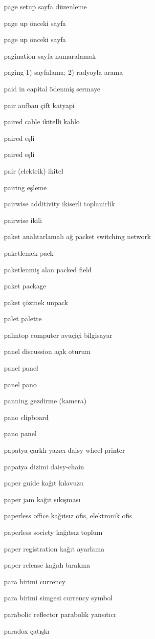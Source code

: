 \documentclass[12pt,fleqn]{article}\usepackage{../../common}
\begin{document}
page setup sayfa düzenleme

page up önceki sayfa

page up önceki sayfa

pagination sayfa numaralamak

paging 1) sayfalama; 2) radyoyla arama

paid in capital ödenmiş sermaye

pair aufbau çift katyapi

paired cable ikitelli kablo

paired eşli

paired eşli

pair (elektrik) ikitel

pairing eşleme

pairwise additivity ikiserli toplanirlik

pairwise ikili

paket anahtarlamalı ağ packet switching network

paketlemek pack

paketlenmiş alan packed field

paket package

paket çözmek unpack

palet palette

palmtop computer avuçiçi bilgisayar

panel discussion açık oturum

panel panel

panel pano

panning gezdirme (kamera)

pano clipboard

pano panel

papatya çarklı yazıcı daisy wheel printer

papatya dizimi daisy-chain

paper guide kağıt kılavuzu

paper jam kağıt sıkışması

paperless office kağıtsız ofis, elektronik ofis

paperless society kağıtsız toplum

paper registration kağıt ayarlama

paper release kağıdı bırakma

para birimi currency

para birimi simgesi currency symbol

parabolic reflector parabolik yansıtıcı

paradox çatışkı
\end{document}
